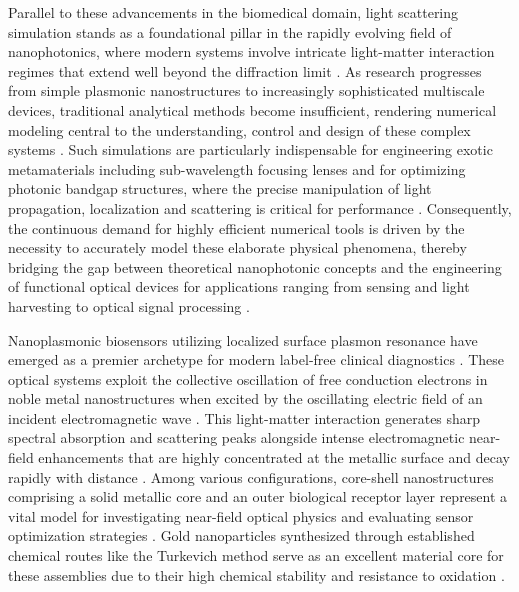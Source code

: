 \documentclass[class=report, crop=false]{standalone}
\begin{document}
\vspace{12pt}

Parallel to these advancements in the biomedical domain, light scattering simulation stands as a foundational pillar in the rapidly evolving field of nanophotonics, where modern systems involve intricate light-matter interaction regimes that extend well beyond the diffraction limit \citep{Gallinet2015}. As research progresses from simple plasmonic nanostructures to increasingly sophisticated multiscale devices, traditional analytical methods become insufficient, rendering numerical modeling central to the understanding, control and design of these complex systems \citep{Gallinet2015}. Such simulations are particularly indispensable for engineering exotic metamaterials including sub-wavelength focusing lenses and for optimizing photonic bandgap structures, where the precise manipulation of light propagation, localization and scattering is critical for performance \citep{teixeira2023finite}. Consequently, the continuous demand for highly efficient numerical tools is driven by the necessity to accurately model these elaborate physical phenomena, thereby bridging the gap between theoretical nanophotonic concepts and the engineering of functional optical devices for applications ranging from sensing and light harvesting to optical signal processing \citep{Gallinet2015, teixeira2023finite}.

\vspace{12pt}

Nanoplasmonic biosensors utilizing localized surface plasmon resonance have emerged as a premier archetype for modern label-free clinical diagnostics \citep{Mayer2011}. These optical systems exploit the collective oscillation of free conduction electrons in noble metal nanostructures when excited by the oscillating electric field of an incident electromagnetic wave \citep{Mayer2011}. This light-matter interaction generates sharp spectral absorption and scattering peaks alongside intense electromagnetic near-field enhancements that are highly concentrated at the metallic surface and decay rapidly with distance \citep{Mayer2011, SAINI2023383}. Among various configurations, core-shell nanostructures comprising a solid metallic core and an outer biological receptor layer represent a vital model for investigating near-field optical physics and evaluating sensor optimization strategies \citep{Mayer2011}. Gold nanoparticles synthesized through established chemical routes like the Turkevich method serve as an excellent material core for these assemblies due to their high chemical stability and resistance to oxidation \citep{SAINI2023383}.
\end{document}
